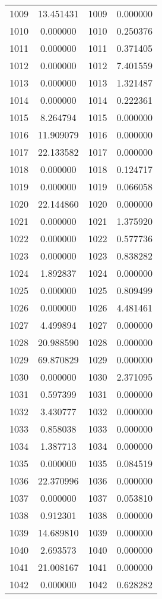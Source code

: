 \documentclass[12pt]{article}
\begin{document}
\begin{longtable}{@{}cccc@{}}
1009 & 13.451431 & 1009 & 0.000000 \\
1010 & 0.000000 & 1010 & 0.250376 \\
1011 & 0.000000 & 1011 & 0.371405 \\
1012 & 0.000000 & 1012 & 7.401559 \\
1013 & 0.000000 & 1013 & 1.321487 \\
1014 & 0.000000 & 1014 & 0.222361 \\
1015 & 8.264794 & 1015 & 0.000000 \\
1016 & 11.909079 & 1016 & 0.000000 \\
1017 & 22.133582 & 1017 & 0.000000 \\
1018 & 0.000000 & 1018 & 0.124717 \\
1019 & 0.000000 & 1019 & 0.066058 \\
1020 & 22.144860 & 1020 & 0.000000 \\
1021 & 0.000000 & 1021 & 1.375920 \\
1022 & 0.000000 & 1022 & 0.577736 \\
1023 & 0.000000 & 1023 & 0.838282 \\
1024 & 1.892837 & 1024 & 0.000000 \\
1025 & 0.000000 & 1025 & 0.809499 \\
1026 & 0.000000 & 1026 & 4.481461 \\
1027 & 4.499894 & 1027 & 0.000000 \\
1028 & 20.988590 & 1028 & 0.000000 \\
1029 & 69.870829 & 1029 & 0.000000 \\
1030 & 0.000000 & 1030 & 2.371095 \\
1031 & 0.597399 & 1031 & 0.000000 \\
1032 & 3.430777 & 1032 & 0.000000 \\
1033 & 0.858038 & 1033 & 0.000000 \\
1034 & 1.387713 & 1034 & 0.000000 \\
1035 & 0.000000 & 1035 & 0.084519 \\
1036 & 22.370996 & 1036 & 0.000000 \\
1037 & 0.000000 & 1037 & 0.053810 \\
1038 & 0.912301 & 1038 & 0.000000 \\
1039 & 14.689810 & 1039 & 0.000000 \\
1040 & 2.693573 & 1040 & 0.000000 \\
1041 & 21.008167 & 1041 & 0.000000 \\
1042 & 0.000000 & 1042 & 0.628282 \\

\end{longtable}
\end{document}
